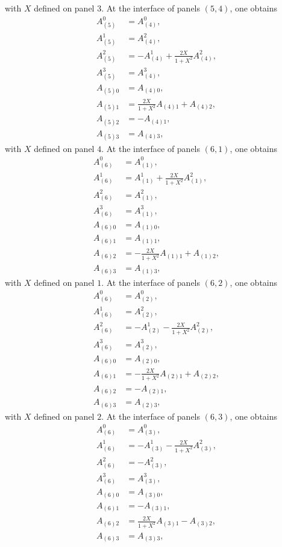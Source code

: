 \documentclass{article}
\begin{document}
with $X$ defined on panel $3$. At the interface of panels $(5,4)$, one obtains
\begin{align}
A^0_{(5)}&=A^0_{(4)}, \\
A^1_{(5)}&=A^2_{(4)}, \\
A^2_{(5)}&=- A^1_{(4)} + \frac{2X}{1+X^2} A^2_{(4)}, \\
A^3_{(5)}&=A^3_{(4)}, \\
A_{(5)0}&=A_{(4)0}, \\
A_{(5)1}&=\frac{2X}{1+X^2} A_{(4)1} + A_{(4)2}, \\
A_{(5)2}&=-A_{(4)1}, \\
A_{(5)3}&=A_{(4)3},
\end{align}
with $X$ defined on panel $4$. At the interface of panels $(6,1)$, one obtains
\begin{align}
A^0_{(6)}&=A^0_{(1)}, \\
A^1_{(6)}&=A^1_{(1)} + \frac{2X}{1+X^2} A^2_{(1)}, \\
A^2_{(6)}&=A^2_{(1)}, \\
A^3_{(6)}&=A^3_{(1)}, \\
A_{(6)0}&=A_{(1)0}, \\
A_{(6)1}&=A_{(1)1}, \\
A_{(6)2}&=-\frac{2X}{1+X^2} A_{(1)1}+A_{(1)2}, \\
A_{(6)3}&=A_{(1)3},
\end{align}
with $X$ defined on panel $1$. At the interface of panels $(6,2)$, one obtains
\begin{align}
A^0_{(6)}&=A^0_{(2)}, \\
A^1_{(6)}&=A^2_{(2)}, \\
A^2_{(6)}&=- A^1_{(2)}-\frac{2X}{1+X^2} A^2_{(2)}, \\
A^3_{(6)}&=A^3_{(2)}, \\
A_{(6)0}&=A_{(2)0}, \\
A_{(6)1}&=-\frac{2X}{1+X^2} A_{(2)1} + A_{(2)2}, \\
A_{(6)2}&=-A_{(2)1}, \\
A_{(6)3}&=A_{(2)3},
\end{align}
with $X$ defined on panel $2$. At the interface of panels $(6,3)$, one obtains
\begin{align}
A^0_{(6)}&=A^0_{(3)}, \\
A^1_{(6)}&=- A^1_{(3)}-\frac{2X}{1+X^2} A^2_{(3)}, \\
A^2_{(6)}&=-A^2_{(3)}, \\
A^3_{(6)}&=A^3_{(3)}, \\
A_{(6)0}&=A_{(3)0}, \\
A_{(6)1}&=-A_{(3)1}, \\
A_{(6)2}&=\frac{2X}{1+X^2} A_{(3)1} - A_{(3)2}, \\
A_{(6)3}&=A_{(3)3},
\end{align}
\end{document}
